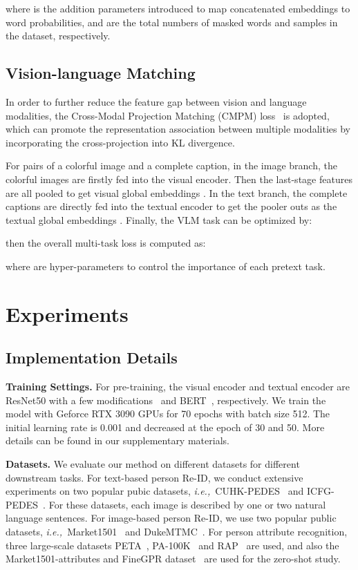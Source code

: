 \documentclass[10pt,twocolumn,letterpaper]{article}
\def\ie{{\it{i.e.,~}}}
\begin{document}
where  is the addition parameters introduced to map concatenated embeddings  to word probabilities,  and  are the total numbers of masked words and samples in the dataset, respectively.

\subsection{Vision-language Matching}
In order to further reduce the feature gap between vision and language modalities, the Cross-Modal Projection Matching (CMPM) loss~\cite{CMPM} is adopted, which can promote the representation association between multiple modalities by incorporating the cross-projection into KL divergence.

For pairs of a colorful image and a complete caption, in the image branch, the colorful images are firstly fed into the visual encoder. Then the last-stage features are all pooled to get visual global embeddings . In the text branch, the complete captions are directly fed into the textual encoder to get the pooler outs as the textual global embeddings . Finally, the VLM task can be optimized by:

then the overall multi-task loss  is computed as:

where  are hyper-parameters to control the importance of each pretext task.

\section{Experiments}
\subsection{Implementation Details}
 \noindent\textbf{Training Settings.} For pre-training, the visual encoder and textual encoder are ResNet50 with a few modifications~\cite{CLIP} and BERT~\cite{bert}, respectively. We train the model with  Geforce RTX 3090 GPUs for 70 epochs with batch size 512. The initial learning rate is 0.001 and decreased at the epoch of 30 and 50. More details can be found in our supplementary materials.
 
\noindent\textbf{Datasets.} We evaluate our method on different datasets for different downstream tasks. For text-based person Re-ID, we conduct extensive experiments on two popular pubic datasets, \ie CUHK-PEDES~\cite{textreid} and ICFG-PEDES~\cite{SSAN}. For these datasets, each image is described by one or two natural language sentences. For image-based person Re-ID, we use two popular public datasets, \ie Market1501~\cite{market} and DukeMTMC~\cite{dukemtmc}. For person attribute recognition, three large-scale datasets PETA~\cite{peta}, PA-100K~\cite{a2} and RAP~\cite{rap} are used, and also the Market1501-attributes and FineGPR dataset~\cite{VTBR} are used for the zero-shot study.
\end{document}
